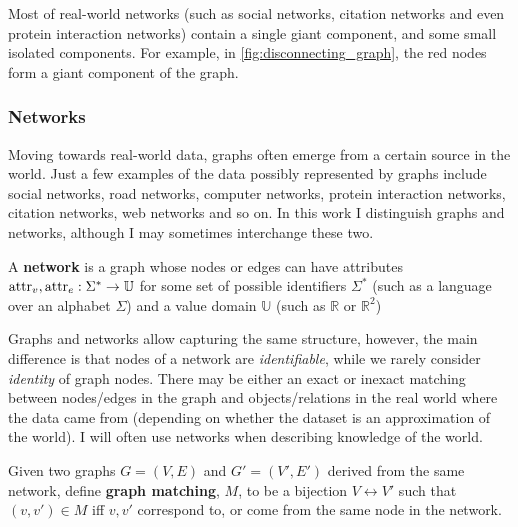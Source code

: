 

Most of real-world networks (such as social networks, citation networks and even protein interaction networks) contain a single giant component, and some small isolated components.
For example, in \autoref{fig:disconnecting_graph}, the red nodes form a giant component of the graph.


\subsubsection{Networks}

Moving towards real-world data, graphs often emerge from a certain source in the world.
Just a few examples of the data possibly represented by graphs include social networks, road networks, computer networks, protein interaction networks, citation networks, web networks and so on.
In this work I distinguish graphs and networks, although I may sometimes interchange these two.

\begin{definition}[Network]
    A \textbf{network} is a graph whose nodes or edges can have attributes $\textnormal{attr}_v, \textnormal{attr}_e : \Sigma^* \rightarrow \mathbb{U}$ for some set of possible identifiers $\Sigma^*$ (such as a language over an alphabet $\Sigma$) and a value domain $\mathbb{U}$ (such as $\mathbb{R}$ or $\mathbb{R}^2$)
\end{definition}

Graphs and networks allow capturing the same structure, however, the main difference is that nodes of a network are \textit{identifiable}, while we rarely consider \textit{identity} of graph nodes.
There may be either an exact or inexact matching between nodes/edges in the graph and objects/relations in the real world where the data came from (depending on whether the dataset is an approximation of the world).
I will often use networks when describing knowledge of the world.

\begin{definition}
    Given two graphs $G = (V, E)$ and $G' = (V', E')$ derived from the same network, define \textbf{graph matching}, $M$, to be a bijection $V \leftrightarrow V'$ such that $(v, v') \in M$ iff $v, v'$ correspond to, or come from the same node in the network.
\end{definition}

